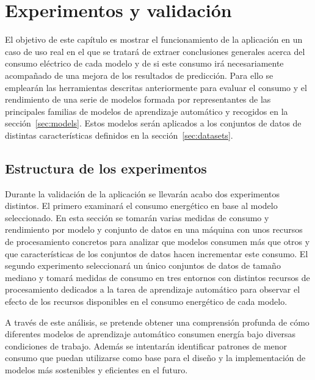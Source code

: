 \chapter{Experimentos y validación}
\label{chap:experimentos}

El objetivo de este capítulo es mostrar el funcionamiento de la aplicación en un caso de uso real en el que se tratará de extraer conclusiones generales acerca del consumo eléctrico de cada modelo y de si este consumo irá necesariamente acompañado de una mejora de los resultados de predicción.
Para ello se emplearán las herramientas descritas anteriormente para evaluar el consumo y el rendimiento de una serie de modelos formada por representantes de las principales familias de modelos de aprendizaje automático y recogidos en la sección~\ref{sec:models}. Estos modelos serán aplicados a los conjuntos de datos de distintas características definidos en la sección~\ref{sec:datasets}.

\section{Estructura de los experimentos}

Durante la validación de la aplicación se llevarán acabo dos experimentos distintos.
El primero examinará el consumo energético en base al modelo seleccionado. En esta sección se tomarán varias medidas de consumo y rendimiento por modelo y conjunto de datos en una máquina con unos recursos de procesamiento concretos para analizar que modelos consumen más que otros y que características de los conjuntos de datos hacen incrementar este consumo.
El segundo experimento seleccionará un único conjuntos de datos de tamaño mediano y tomará medidas de consumo en tres entornos con distintos recursos de procesamiento dedicados a la tarea de aprendizaje automático para observar el efecto de los recursos disponibles en el consumo energético de cada modelo.

A través de este análisis, se pretende obtener una comprensión profunda de cómo diferentes modelos de aprendizaje automático consumen energía bajo diversas condiciones de trabajo. Además se intentarán identificar patrones de menor consumo que puedan utilizarse como base para el diseño y la implementación de modelos más sostenibles y eficientes en el futuro.


